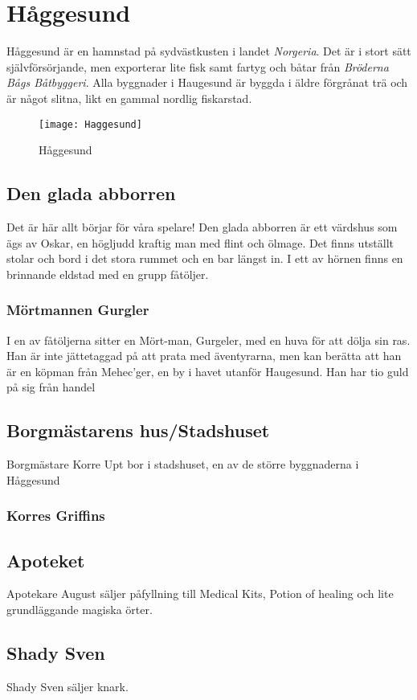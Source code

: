 \chapter*{Håggesund}
%
Håggesund är en hamnstad på sydvästkusten i landet \textit{Norgeria}. Det är i stort sätt självförsörjande, men exporterar lite fisk samt fartyg och båtar från \textit{Bröderna Bågs Båtbyggeri}. 
Alla byggnader i Haugesund är byggda i äldre förgrånat trä och är något slitna, likt en gammal nordlig fiskarstad.
%
\begin{figure}
	\centering
	\texttt{[image: Haggesund]}
	\caption{Håggesund}
\end{figure}
%
\section*{Den glada abborren}
Det är här allt börjar för våra spelare! Den glada abborren är ett värdshus som ägs av Oskar, en högljudd kraftig man med flint och ölmage. Det finns utställt stolar och bord i det stora rummet och en bar längst in. I ett av hörnen finns en brinnande eldstad med en grupp fåtöljer. 
%
\subsection*{Mörtmannen Gurgler}
I en av fåtöljerna sitter en Mört-man, Gurgeler, med en huva för att dölja sin ras. Han är inte jättetaggad på att prata med äventyrarna, men kan berätta att han är en köpman från Mehec’ger, 
en by i havet utanför Haugesund. Han har tio guld på sig från handel %
%
\section*{Borgmästarens hus/Stadshuset}
Borgmästare Korre Upt bor i stadshuset, en av de större byggnaderna i Håggesund
\subsection*{Korres Griffins}
%
\section*{Apoteket}
Apotekare August säljer påfyllning till Medical Kits, Potion of healing och lite grundläggande magiska örter.
%
\section*{Shady Sven}
Shady Sven säljer knark.
%
